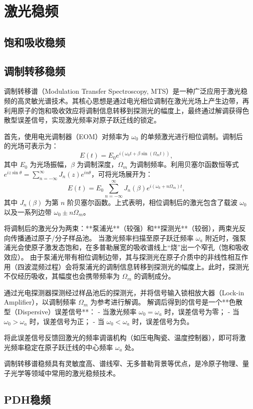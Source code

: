\chapter{激光稳频}
\section{饱和吸收稳频}
\section{调制转移稳频}
调制转移谱（Modulation Transfer Spectroscopy, MTS）是一种广泛应用于激光稳频的高灵敏光谱技术。其核心思想是通过电光相位调制在激光光场上产生边带，再利用原子的饱和吸收效应将调制信息转移到探测光的幅度上，最终通过解调获得色散型误差信号，实现激光频率对原子跃迁线的锁定。

首先，使用电光调制器（EOM）对频率为 $\omega_0$ 的单频激光进行相位调制。调制后的光场可表示为：
\begin{equation}
	E(t) = E_0 e^{i\left(\omega_0 t + \beta \sin(\Omega_m t)\right)},
\end{equation}
其中 $E_0$ 为光场振幅，$\beta$ 为调制深度，$\Omega_m$ 为调制频率。利用贝塞尔函数恒等式 $e^{i z \sin\theta} = \sum_{n=-\infty}^{\infty} J_n(z) e^{i n \theta}$，可将光场展开为：
\begin{equation}
	E(t) = E_0 \sum_{n=-\infty}^{\infty} J_n(\beta) e^{i\left(\omega_0 + n \Omega_m\right) t},
\end{equation}
其中 $J_n(\beta)$ 为第 $n$ 阶贝塞尔函数。上式表明，相位调制后的激光包含了载波 $\omega_0$ 以及一系列边带 $\omega_0 \pm n \Omega_m$。


将调制后的激光分为两束：**泵浦光**（较强）和**探测光**（较弱），两束光反向传播通过原子/分子样品池。
当激光频率扫描至原子跃迁频率 $\omega_a$ 附近时，强泵浦光会使原子激发态饱和，在多普勒展宽的吸收谱线上“烧”出一个窄孔（饱和吸收效应）。
由于泵浦光带有相位调制边带，其与探测光在原子介质中的非线性相互作用（四波混频过程）会将泵浦光的调制信息转移到探测光的幅度上。此时，探测光不仅经历吸收，其幅度也会携带频率为 $\Omega_m$ 的调制成分。

通过光电探测器探测经过样品池后的探测光，并将信号输入锁相放大器（Lock-in Amplifier），以调制频率 $\Omega_m$ 为参考进行解调。
解调后得到的信号是一个**色散型（Dispersive）误差信号**：
- 当激光频率 $\omega_0 = \omega_a$ 时，误差信号为零；
- 当 $\omega_0 > \omega_a$ 时，误差信号为正；
- 当 $\omega_0 < \omega_a$ 时，误差信号为负。

将此误差信号反馈回激光的频率调谐机构（如压电陶瓷、温度控制器），即可将激光频率稳定在原子跃迁线的中心频率 $\omega_a$ 处。

调制转移谱稳频具有灵敏度高、谱线窄、无多普勒背景等优点，是冷原子物理、量子光学等领域中常用的激光稳频技术。
\section{PDH稳频}